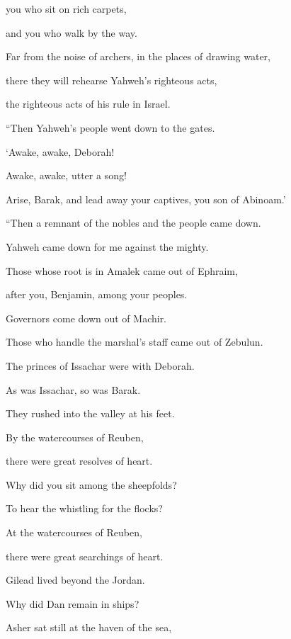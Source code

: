 {\par }{\QB you who sit on rich carpets,
\par }{\QB and you who walk by the way.
\par }{\Q {}Far from the noise of archers, in the places of drawing water,
\par }{\QB there they will rehearse Yahweh’s righteous acts,
\par }{\QB the righteous acts of his rule in Israel.
\par }{\BB \par }{\Q “Then Yahweh’s people went down to the gates.
\par }{\QB {}‘Awake, awake, Deborah!
\par }{\QB Awake, awake, utter a song!
\par }{\QB Arise, Barak, and lead away your captives, you son of Abinoam.’
\par }{\BB \par }{\Q {}“Then a remnant of the nobles and the people came down.
\par }{\QB Yahweh came down for me against the mighty.
\par }{\Q {}Those whose root is in Amalek came out of Ephraim,
\par }{\QB after you, Benjamin, among your peoples.
\par }{\Q Governors come down out of Machir.
\par }{\QB Those who handle the marshal’s staff came out of Zebulun.
\par }{\Q {}The princes of Issachar were with Deborah.
\par }{\QB As was Issachar, so was Barak.
\par }{\QB They rushed into the valley at his feet.
\par }{\Q By the watercourses of Reuben,
\par }{\QB there were great resolves of heart.
\par }{\Q {}Why did you sit among the sheepfolds?
\par }{\QB To hear the whistling for the flocks?
\par }{\Q At the watercourses of Reuben,
\par }{\QB there were great searchings of heart.
\par }{\Q {}Gilead lived beyond the Jordan.
\par }{\QB Why did Dan remain in ships?
\par }{\QB Asher sat still at the haven of the sea,
}
